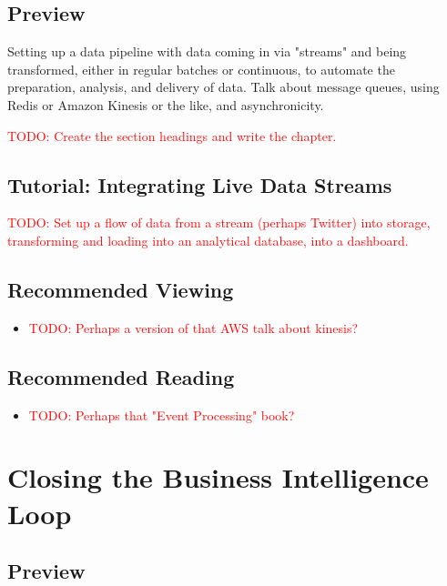 \documentclass[11pt]{book}
\newcommand{\todo}[1]{\textcolor{red}{TODO: #1}} %
\begin{document}
\section*{Preview}

Setting up a data pipeline with data coming in via "streams" and being transformed, either in regular batches or continuous, to automate the preparation, analysis, and delivery of data.  Talk about message queues, using Redis or Amazon Kinesis or the like, and asynchronicity.

\todo{Create the section headings and write the chapter.}

\section*{Tutorial: Integrating Live Data Streams}

\todo{Set up a flow of data from a stream (perhaps Twitter) into storage, transforming and loading into an analytical database, into a dashboard.}

\section*{Recommended Viewing}
\begin{itemize}
    \item \todo{Perhaps a version of that AWS talk about kinesis?}
\end{itemize}

\section*{Recommended Reading}
\begin{itemize}
    \item \todo{Perhaps that "Event Processing" book?}
\end{itemize}








\chapter{Closing the Business Intelligence Loop}

\section*{Preview}
\end{document}
